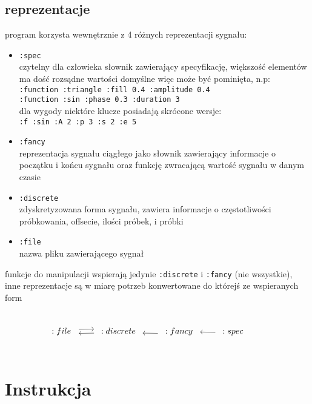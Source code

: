 \documentclass[12pt]{article}
\newcommand{\cljt}[1]{\texttt{#1}}
\begin{document}
\subsection{reprezentacje}
program korzysta wewnętrznie z 4 różnych reprezentacji sygnału:
\begin{itemize}
	\item		\cljt{:spec} \\
	      czytelny dla człowieka słownik zawierający specyfikację, większość elementów ma dość rozsądne wartości domyślne więc może być pominięta, n.p:\\
	      \cljt{{:function :triangle :fill 0.4 :amplitude 0.4}} \\
	      \cljt{{:function :sin :phase 0.3 :duration 3}} \\
	      dla wygody niektóre klucze posiadają skrócone wersje: \\
	      \cljt{{:f :sin :A 2 :p 3 :s 2 :e 5}}

	\item		\cljt{:fancy} \\
	      reprezentacja sygnału ciągłego jako słownik zawierający informacje o początku i końcu sygnału oraz funkcję zwracającą wartość sygnału w danym czasie
	\item		\cljt{:discrete} \\
	      zdyskretyzowana forma sygnału, zawiera informacje o częstotliwości próbkowania, offsecie, ilości próbek, i próbki
	\item		\cljt{:file} \\
	      nazwa pliku zawierającego sygnał
\end{itemize}
funkcje do manipulacji wspierają jedynie \cljt{:discrete} i \cljt{:fancy} (nie wszystkie), inne reprezentacje są w miarę potrzeb konwertowane do którejś ze wspieranych form
\[\begin{tikzcd}[%
			cells={nodes={circle}},
			every arrow/.append style={shorten <= 1mm, shorten >= 1mm}] %
		:file \arrow[shift left]{r} &
		:discrete \arrow[shift left]{l} &
		:fancy \arrow[shift left]{l} &
		:spec \arrow{l} &
	\end{tikzcd}\]


\section{Instrukcja}
\end{document}
